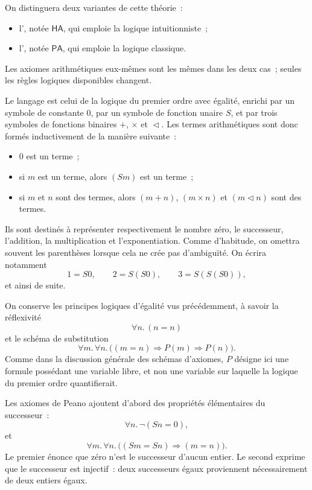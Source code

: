 On distinguera deux variantes de cette théorie :
\begin{itemize}
\item l', notée $\mathsf{HA}$, qui
  emploie la logique intuitionniste ;
\item l', notée $\mathsf{PA}$, qui emploie
  la logique classique.
\end{itemize}
Les axiomes arithmétiques eux-mêmes sont les mêmes dans les deux cas ;
seules les règles logiques disponibles changent.

\thingy
Le langage est celui de la logique du premier ordre avec égalité, enrichi
par un symbole de constante $0$, par un symbole de fonction unaire $S$,
et par trois symboles de fonctions binaires $+$, $\times$ et
$\vartriangleleft$.  Les termes arithmétiques sont donc formés
inductivement de la manière suivante :
\begin{itemize}
\item $0$ est un terme ;
\item si $m$ est un terme, alors $(Sm)$ est un terme ;
\item si $m$ et $n$ sont des termes, alors $(m+n)$, $(m\times n)$ et
  $(m\vartriangleleft n)$ sont des termes.
\end{itemize}

Ils sont destinés à représenter respectivement le nombre zéro, le
successeur, l'addition, la multiplication et l'exponentiation.  Comme
d'habitude, on omettra souvent les parenthèses lorsque cela ne crée pas
d'ambiguïté.  On écrira notamment
\[
1=S0,\qquad 2=S(S0),\qquad 3=S(S(S0)),
\]
et ainsi de suite.

\thingy
On conserve les principes logiques d'égalité vus précédemment, à savoir
la réflexivité
\[
\forall n.\,(n=n)
\]
et le schéma de substitution
\[
\forall m.\,\forall n.\,
\bigl((m=n)\Rightarrow P(m)\Rightarrow P(n)\bigr).
\]
Comme dans la discussion générale des schémas d'axiomes, $P$ désigne ici
une formule possédant une variable libre, et non une variable sur laquelle
la logique du premier ordre quantifierait.

\thingy
Les axiomes de Peano ajoutent d'abord des propriétés élémentaires du
successeur :
\[
\forall n.\,\neg(Sn=0),
\]
et
\[
\forall m.\,\forall n.\,\bigl((Sm=Sn)\Rightarrow(m=n)\bigr).
\]
Le premier énonce que zéro n'est le successeur d'aucun entier.  Le
second exprime que le successeur est injectif : deux successeurs égaux
proviennent nécessairement de deux entiers égaux.

